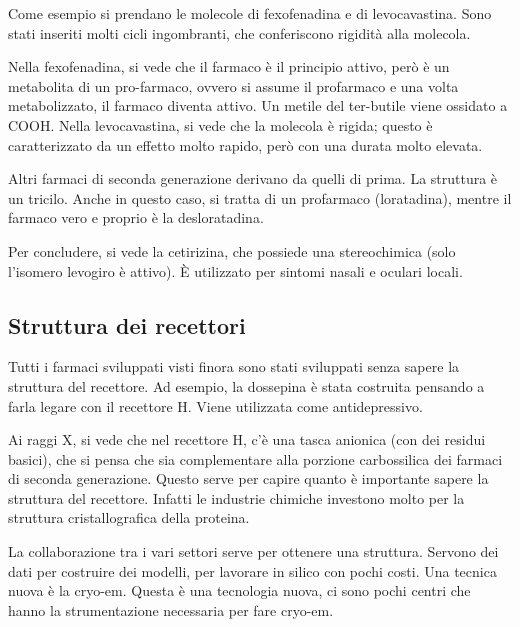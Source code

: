 Come esempio si prendano le molecole di fexofenadina e di levocavastina. Sono stati inseriti molti cicli ingombranti, che conferiscono rigidità
alla molecola.

Nella fexofenadina, si vede che il farmaco è il principio attivo, però è un metabolita
di un pro-farmaco, ovvero si assume il profarmaco e una volta
metabolizzato, il farmaco diventa attivo. Un metile del ter-butile viene
ossidato a COOH.
Nella levocavastina, si vede che la molecola è rigida; questo è caratterizzato da un
effetto molto rapido, però con una durata molto elevata.


Altri farmaci di seconda generazione derivano da quelli di prima.
La struttura è un tricilo. Anche in questo caso, si tratta di un profarmaco (loratadina), mentre il farmaco vero e proprio è la desloratadina.


Per concludere, si vede la cetirizina, che possiede una stereochimica
(solo l'isomero levogiro è attivo). È utilizzato per sintomi nasali e
oculari locali.


\subsection{Struttura dei recettori}

Tutti i farmaci sviluppati visti finora sono stati sviluppati senza
sapere la struttura del recettore.
Ad esempio, la dossepina è stata costruita pensando a farla legare con
il recettore H. Viene utilizzata come antidepressivo.


Ai raggi X, si vede che nel recettore H, c'è una tasca anionica (con
dei residui basici), che si pensa che sia complementare alla porzione
carbossilica dei farmaci di seconda generazione. Questo serve per capire
quanto è importante sapere la struttura del recettore.
Infatti le industrie chimiche investono molto per la struttura
cristallografica della proteina.

La collaborazione tra i vari settori serve per ottenere una struttura.
Servono dei dati per costruire dei modelli, per lavorare in silico con
pochi costi.
Una tecnica nuova è la cryo-em. Questa è una tecnologia nuova, ci sono
pochi centri che hanno la strumentazione necessaria per fare cryo-em.

